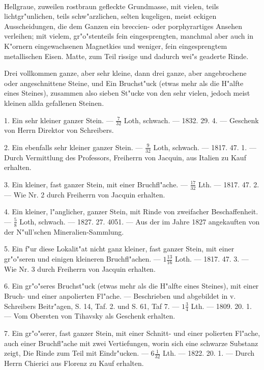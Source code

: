 \documentclass[a4paper, 11pt, oneside, polutonikogreek, german]{article}
\begin{document}
\paragraph{}
Hellgraue, zuweilen rostbraun gefleckte Grundmasse, mit vielen, teils lichtgr"unlichen, teils schw"arzlichen, selten kugeligen, meist eckigen Ausscheidungen, die dem Ganzen ein breccien- oder porphyrartiges Ansehen verleihen; mit vielem, gr"o"stenteils fein eingesprengten, manchmal aber auch in K"ornern eingewachsenen Magnetkies und weniger, fein eingesprengtem metallischen Eisen. Matte, zum Teil rissige und dadurch wei"s geaderte Rinde.

Drei vollkommen ganze, aber sehr kleine, dann drei ganze, aber angebrochene oder angeschnittene Steine, und Ein Bruchst"uck (etwas mehr als die H"alfte eines Steines), zusammen also sieben St"ucke von den sehr vielen, jedoch meist kleinen allda gefallenen Steinen.

1. Ein sehr kleiner ganzer Stein. --- $\frac{7}{32}$ Loth, schwach. --- 1832. 29. 4. --- Geschenk von Herrn Direktor von Schreibers.

2. Ein ebenfalls sehr kleiner ganzer Stein. --- $\frac{9}{32}$ Loth, schwach. --- 1817. 47. 1. --- Durch Vermittlung des Professors, Freiherrn von Jacquin, aus Italien zu Kauf erhalten.

3. Ein kleiner, fast ganzer Stein, mit einer Bruchfl"ache. --- $\frac{17}{32}$ Lth. --- 1817. 47. 2. --- Wie Nr. 2 durch Freiherrn von Jacquin erhalten.

4. Ein kleiner, l"anglicher, ganzer Stein, mit Rinde von zweifacher Beschaffenheit. --- $\frac{5}{8}$ Loth, schwach. --- 1827. 27. 4051. --- Aus der im Jahre 1827 angekauften von der N"ull'schen Mineralien-Sammlung.

5. Ein f"ur diese Lokalit"at nicht ganz kleiner, fast ganzer Stein, mit einer gr"o"seren und einigen kleineren Bruchfl"achen. --- $1\frac{13}{16}$ Loth. --- 1817. 47. 3. --- Wie Nr. 3 durch Freiherrn von Jacquin erhalten.

6. Ein gr"o"seres Bruchst"uck (etwas mehr als die H"alfte eines Steines), mit einer Bruch- und einer anpolierten Fl"ache. --- Beschrieben und abgebildet in v. Schreibers Beitr"agen, S. 14, Taf. 2. und S. 61, Taf 7. --- $1\frac{3}{4}$ Lth. --- 1809. 20. 1. --- Vom Obersten von Tihavsky als Geschenk erhalten.

7. Ein gr"o"serer, fast ganzer Stein, mit einer Schnitt- und einer polierten Fl"ache, auch einer Bruchfl"ache mit zwei Vertiefungen, worin sich eine schwarze Substanz zeigt, Die Rinde zum Teil mit Eindr"ucken. --- $6\frac{1}{32}$ Lth. --- 1822. 20. 1. --- Durch Herrn Chierici aus Florenz zu Kauf erhalten.
\end{document}
